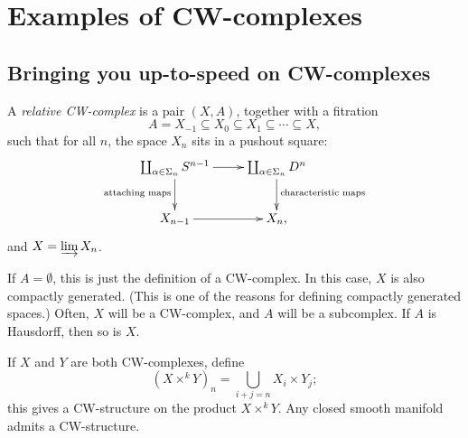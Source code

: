 \section{Examples of CW-complexes}
\subsection{Bringing you up-to-speed on CW-complexes}
\begin{definition}
    A \emph{relative CW-complex} is a pair $(X,A)$, together with a fitration
    $$A=X_{-1}\subseteq X_0\subseteq X_1\subseteq\cdots\subseteq X,$$
    such that for all $n$, the space $X_n$ sits in a pushout square:
    $$
    \xymatrix{
	\coprod_{\alpha\in \Sigma_n}S^{n-1}\ar[r]\ar[d]_{\text{attaching maps}} & \coprod_{\alpha\in \Sigma_n}D^n\ar[d]^{\text{characteristic maps}}\\
	X_{n-1}\ar[r] & X_n,
    }
    $$
    and $X=\varinjlim X_n$.
\end{definition}
If $A=\emptyset$, this is just the definition of a CW-complex.
In this case, $X$ is also compactly generated.
(This is one of the reasons for defining compactly generated spaces.)
Often, $X$ will be a CW-complex, and $A$ will be a subcomplex.
If $A$ is Hausdorff, then so is $X$.

If $X$ and $Y$ are both CW-complexes, define
$$(X\times^k Y)_n = \bigcup_{i+j = n}X_i\times Y_j;$$
this gives a CW-structure on the product $X\times^k Y$.
Any closed smooth manifold admits a CW-structure. 

